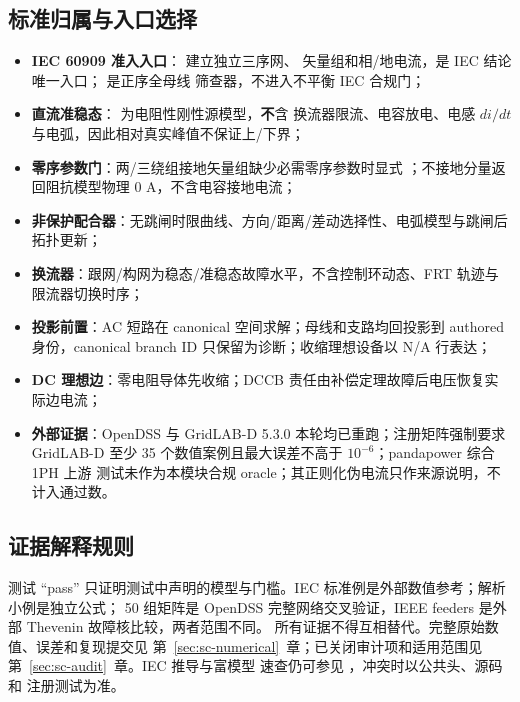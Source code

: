 \subsection{标准归属与入口选择}
\begin{itemize}
  \item \textbf{IEC 60909 准入入口}： 建立独立三序网、
        矢量组和相/地电流，是 IEC 结论唯一入口； 是正序全母线
        筛查器，不进入不平衡 IEC 合规门；
  \item \textbf{直流准稳态}： 为电阻性刚性源模型，\textbf{不}含
        换流器限流、电容放电、电感 $di/dt$ 与电弧，因此相对真实峰值不保证上/下界；
  \item \textbf{零序参数门}：两/三绕组接地矢量组缺少必需零序参数时显式
        ；不接地分量返回阻抗模型物理 0 A，不含电容接地电流；
  \item \textbf{非保护配合器}：无跳闸时限曲线、方向/距离/差动选择性、电弧模型与跳闸后拓扑更新；
  \item \textbf{换流器}：跟网/构网为稳态/准稳态故障水平，不含控制环动态、FRT 轨迹与限流器切换时序；
  \item \textbf{投影前置}：AC 短路在 canonical 空间求解；母线和支路均回投影到 authored
        身份，canonical branch ID 只保留为诊断；收缩理想设备以 N/A 行表达；
  \item \textbf{DC 理想边}：零电阻导体先收缩；DCCB 责任由补偿定理故障后电压恢复实际边电流；
  \item \textbf{外部证据}：OpenDSS 与 GridLAB-D 5.3.0 本轮均已重跑；注册矩阵强制要求
        GridLAB-D 至少 35 个数值案例且最大误差不高于 $10^{-6}$；pandapower 综合 1PH 上游
        测试未作为本模块合规 oracle；其正则化伪电流只作来源说明，不计入通过数。
\end{itemize}

\subsection{证据解释规则}
测试 ``pass'' 只证明测试中声明的模型与门槛。IEC 标准例是外部数值参考；解析小例是独立公式；
50 组矩阵是 OpenDSS 完整网络交叉验证，IEEE feeders 是外部 Thevenin 故障核比较，两者范围不同。
所有证据不得互相替代。完整原始数值、误差和复现提交见
第~\ref{sec:sc-numerical}~章；已关闭审计项和适用范围见第~\ref{sec:sc-audit}~章。IEC 推导与富模型
速查仍可参见 ，冲突时以公共头、源码和
注册测试为准。
